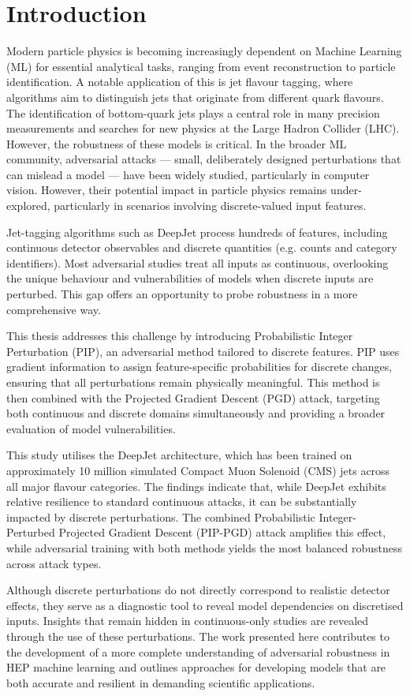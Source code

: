 \chapter{Introduction}

Modern particle physics is becoming increasingly dependent on Machine Learning (ML) for essential analytical tasks, ranging from event reconstruction to particle identification. A notable application of this is jet flavour tagging, where algorithms aim to distinguish jets that originate from different quark flavours. The identification of bottom-quark jets plays a central role in many precision measurements and searches for new physics at the Large Hadron Collider (LHC). However, the robustness of these models is critical. In the broader ML community, adversarial attacks — small, deliberately designed perturbations that can mislead a model — have been widely studied, particularly in computer vision. However, their potential impact in particle physics remains under-explored, particularly in scenarios involving discrete-valued input features.

Jet-tagging algorithms such as DeepJet process hundreds of features, including continuous detector observables and discrete quantities (e.g. counts and category identifiers). Most adversarial studies treat all inputs as continuous, overlooking the unique behaviour and vulnerabilities of models when discrete inputs are perturbed. This gap offers an opportunity to probe robustness in a more comprehensive way.

This thesis addresses this challenge by introducing Probabilistic Integer Perturbation (PIP), an adversarial method tailored to discrete features. PIP uses gradient information to assign feature-specific probabilities for discrete changes, ensuring that all perturbations remain physically meaningful. This method is then combined with the Projected Gradient Descent (PGD) attack, targeting both continuous and discrete domains simultaneously and providing a broader evaluation of model vulnerabilities.

This study utilises the DeepJet architecture, which has been trained on approximately 10 million simulated Compact Muon Solenoid (CMS) jets across all major flavour categories. The findings indicate that, while DeepJet exhibits relative resilience to standard continuous attacks, it can be substantially impacted by discrete perturbations. The combined Probabilistic Integer-Perturbed Projected Gradient Descent (PIP-PGD) attack amplifies this effect, while adversarial training with both methods yields the most balanced robustness across attack types.

Although discrete perturbations do not directly correspond to realistic detector effects, they serve as a diagnostic tool to reveal model dependencies on discretised inputs. Insights that remain hidden in continuous-only studies are revealed through the use of these perturbations. The work presented here contributes to the development of a more complete understanding of adversarial robustness in HEP machine learning and outlines approaches for developing models that are both accurate and resilient in demanding scientific applications.

